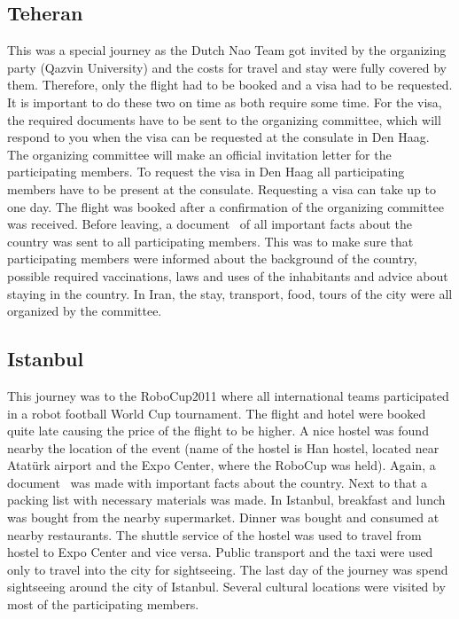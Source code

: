 \documentclass[11pt,a4paper,oneside]{article}
\begin{document}
\subsection{Teheran}
This was a special journey as the Dutch Nao Team got invited by the organizing party (Qazvin University) and the costs for travel and stay were fully covered by them. Therefore, only the flight had to be booked and a visa had to be requested. It is important to do these two on time as both require some time. For the visa, the required documents have to be sent to the organizing committee, which will respond to you when the visa can be requested at the consulate in Den Haag. The organizing committee will make an official invitation letter for the participating members. To request the visa in Den Haag all participating members have to be present at the consulate. Requesting a visa can take up to one day. The flight was booked after a confirmation of the organizing committee was received. Before leaving, a document~\cite{Verschoor2011Iran} of all important facts about the country was sent to all participating members. This was to make sure that participating members were informed about the background of the country, possible required vaccinations, laws and uses of the inhabitants and advice about staying in the country. In Iran, the stay, transport, food, tours of the city were all organized by the committee. 

\subsection{Istanbul}
This journey was to the RoboCup2011 where all international teams participated in a robot football World Cup tournament. The flight and hotel were booked quite late causing the price of the flight to be higher. A nice hostel was found nearby the location of the event (name of the hostel is Han hostel, located near Atatürk airport and the Expo Center, where the RoboCup was held). Again, a document~\cite{Verschoor2011Istanbul} was made with important facts about the country. Next to that a packing list with necessary materials was made. In Istanbul, breakfast and lunch was bought from the nearby supermarket. Dinner was bought and consumed at nearby restaurants. The shuttle service of the hostel was used to travel from hostel to Expo Center and vice versa. Public transport and the taxi were used only to travel into the city for sightseeing. The last day of the journey was spend sightseeing around the city of Istanbul. Several cultural locations were visited by most of the participating members.
\end{document}
